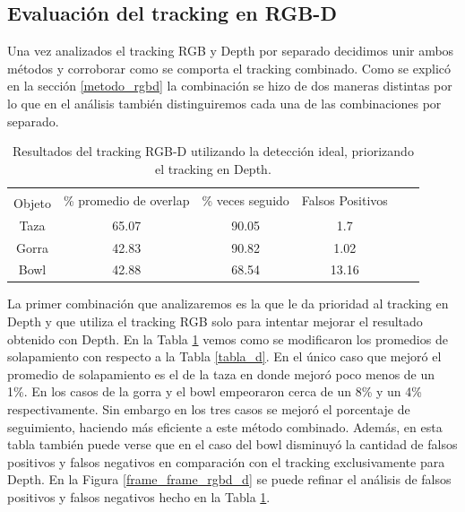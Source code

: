 \subsection{Evaluación del tracking en RGB-D}
Una vez analizados el tracking RGB y Depth por separado decidimos unir ambos métodos y corroborar como se comporta el tracking combinado. Como se explicó en la sección \ref{metodo_rgbd} la combinación se hizo de dos maneras distintas por lo que en el análisis también distinguiremos cada una de las combinaciones por separado.

\begin{table}[h]
    \begin{tabular}{|c|c|c|c|c|c|}
    \hline
    & \multirow{2}{2.4cm}{\% promedio de overlap} & \multirow{2}{2cm}{\% veces seguido} & \multirow{2}{1.6cm}{Falsos Positivos}\\
	Objeto & & &\\
    \hline
    Taza   & 65.07      & 90.05             &   1.7 \\
    \hline
    Gorra  & 42.83      & 90.82             &  1.02 \\
    \hline
    Bowl   & 42.88      & 68.54             & 13.16 \\
    \hline
    \end{tabular}
\caption{Resultados del tracking RGB-D utilizando la detección ideal, priorizando el tracking en Depth.}
\label{tabla_rgbd_d}
\end{table}

La primer combinación que analizaremos es la que le da prioridad al tracking en Depth y que utiliza el tracking RGB solo para intentar mejorar el resultado obtenido con Depth. En la Tabla \ref{tabla_rgbd_d} vemos como se modificaron los promedios de solapamiento con respecto a la Tabla \ref{tabla_d}. En el único caso que mejoró el promedio de solapamiento es el de la taza en donde mejoró poco menos de un 1\%. En los casos de la gorra y el bowl empeoraron cerca de un 8\% y un 4\% respectivamente. Sin embargo en los tres casos se mejoró el porcentaje de seguimiento, haciendo más eficiente a este método combinado. Además, en esta tabla también puede verse que en el caso del bowl disminuyó la cantidad de falsos positivos y falsos negativos en comparación con el tracking exclusivamente para Depth. En la Figura \ref{frame_frame_rgbd_d} se puede refinar el análisis de falsos positivos y falsos negativos hecho en la Tabla \ref{tabla_rgbd_d}.

